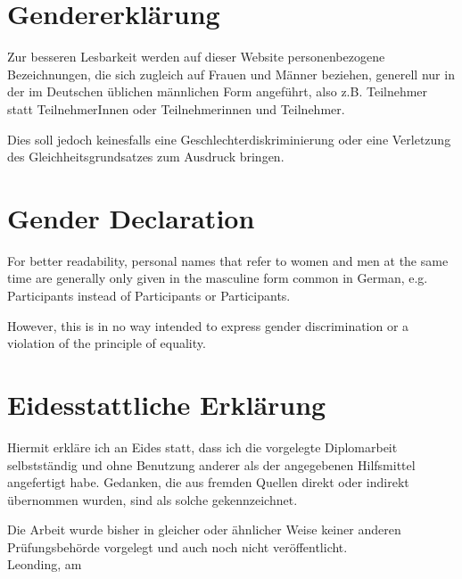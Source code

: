\section*{Gendererklärung}

Zur besseren Lesbarkeit werden auf dieser Website personenbezogene Bezeichnungen, die sich zugleich auf Frauen und Männer beziehen, generell nur in der im Deutschen üblichen männlichen Form angeführt, also z.B. \glqq Teilnehmer\grqq{} statt \glqq TeilnehmerInnen\grqq{} oder \glqq Teilnehmerinnen und Teilnehmer\grqq{}.

Dies soll jedoch keinesfalls eine Geschlechterdiskriminierung oder eine Verletzung des Gleichheitsgrundsatzes zum Ausdruck bringen.

\section*{Gender Declaration}

For better readability, personal names that refer to women and men at the same time are generally only given in the masculine form common in German, e.g. \glqq Participants\grqq{} instead of \glqq Participants\grqq{} or \glqq Participants\grqq{}.

However, this is in no way intended to express gender discrimination or a violation of the principle of equality.

\pagebreak

\section*{Eidesstattliche Erklärung}
Hiermit erkläre ich an Eides statt, dass ich die vorgelegte Diplomarbeit selbstständig und ohne Benutzung anderer als der angegebenen Hilfsmittel angefertigt habe. Gedanken, die aus fremden Quellen direkt oder indirekt übernommen wurden, sind als solche gekennzeichnet.

Die Arbeit wurde bisher in gleicher oder ähnlicher Weise keiner anderen Prüfungsbehörde vorgelegt und auch noch nicht veröffentlicht. \\[1em]
Leonding, am \duedatede \\[5em]
\ifthenelse{\isundefined{\firstauthor}}{}{\firstauthor}
\ifthenelse{\isundefined{\secondauthor}}{}{\kern-1ex, \secondauthor}
\ifthenelse{\isundefined{\thirdauthor}}{}{\kern-1ex, \thirdauthor}
\ifthenelse{\isundefined{\fourthauthor}}{}{\kern-1ex, \fourthauthor} \\[5em]

